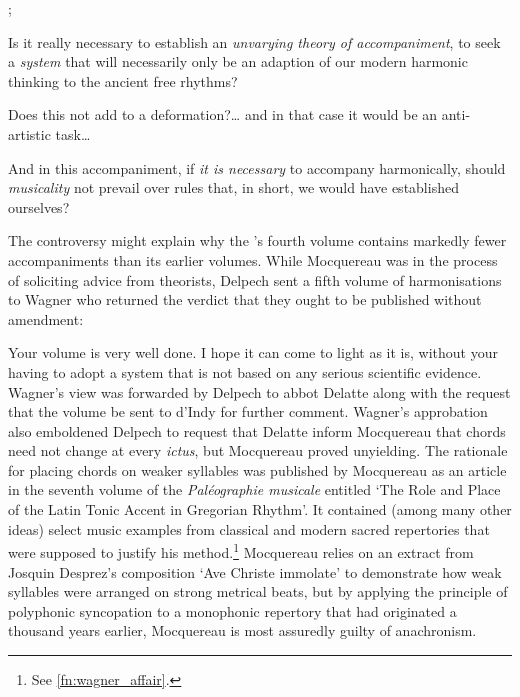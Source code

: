   {; \cite[Transcribed on p.~440 and reproduced between pp.~444 and 445]{HalaSolesmesmusiciensSchola2017}}
{Is it really necessary to establish an \emph{unvarying theory of accompaniment}, to seek a \emph{system} that will necessarily only be an adaption of our modern harmonic thinking to the ancient free rhythms?

\parindent=10pt
Does this not add to a deformation?\ldots{} and in that case it would be an anti-artistic task\dots{}

\parindent=10pt
And in this accompaniment, if \emph{it is necessary} to accompany harmonically, should \emph{musicality} not prevail over rules that, in short, we would have established ourselves?}

\pagebreak{}
The controversy might explain why the \ldo{}'s fourth volume contains markedly fewer accompaniments than its earlier volumes.
While Mocquereau was in the process of soliciting advice from theorists, Delpech sent a fifth volume of harmonisations to Wagner who returned the verdict that they ought to be published without amendment:

  {}
{Your volume is very well done. I hope it can come to light as it is, without your having to adopt a system that is not based on any serious scientific evidence.}
\noindent
Wagner's view was forwarded by Delpech to abbot Delatte along with the request that the volume be sent to d'Indy for further comment.
Wagner's approbation also emboldened Delpech to request that Delatte inform Mocquereau that chords need not change at every \emph{ictus}, but Mocquereau proved unyielding.
The rationale for placing chords on weaker syllables was published by Mocquereau as an article in the seventh volume of the \emph{Paléographie musicale} entitled `The Role and Place of the Latin Tonic Accent in Gregorian Rhythm'.
It contained (among many other ideas) select music examples from classical and modern sacred repertories that were supposed to justify his method.\footnote{See \cref{fn:wagner_affair}.}
Mocquereau relies on an extract from Josquin Desprez's composition `Ave Christe immolate' to demonstrate how weak syllables were arranged on strong metrical beats, but by applying the principle of polyphonic syncopation to a monophonic repertory that had originated a thousand years earlier, Mocquereau is most assuredly guilty of anachronism.

